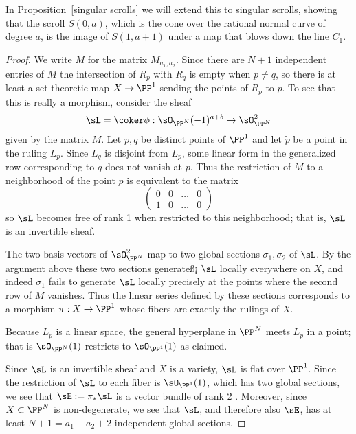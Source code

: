 In Proposition~\ref{singular scrolls} we will extend this to singular scrolls, showing that the scroll $S(0,a)$, 
 which is the cone over the rational normal curve 
of degree $a$, is the image of $S(1,a+1)$ under a map that blows down the line $C_{1}$.

\begin{proof} We write $M$ for the matrix $M_{a_{1}, a_{2}}$.
Since there are $N+1$ independent entries of $M$ the intersection
of $R_{p}$ with $R_{q}$ is empty when $p\neq q$, so there is at least a set-theoretic map $X\to \PP^{1}$ sending the points of $R_{p}$ to $p$. To see that this is really a morphism, consider the sheaf
$$
\sL = \coker \phi: \sO_{\PP^{N}}(-1)^{a+b} \to \sO_{\PP^{N}}^{2}
$$
given by the matrix $M$. Let $p,q$ be distinct points of $\PP^{1}$ and  let
$\tilde p$ be a point in the ruling $L_p$. Since $L_q$ is disjoint from $L_{p}$, some linear form in the generalized row corresponding to $q$ does not vanish at $p$. Thus
the restriction of $M$ to a neighborhood of the point $p$ is equivalent to the matrix
$$
\begin{pmatrix}
0&0&\dots&0 \\
1&0&\dots&0 
\end{pmatrix}
$$
so $\sL$ becomes free of rank 1 when restricted to this neighborhood; that is, $\sL$ is an invertible sheaf.

The two basis vectors of $\sO_{\PP^{N}}^{2}$ map to two global sections
$\sigma_{1},\sigma_{2}$ of $\sL$. By the argument above these two sections generateß¡ $\sL$ locally everywhere on $X$, and indeed $\sigma_{1}$ fails to generate $\sL$ locally precisely at the points where the second row of $M$ vanishes. Thus the linear series
defined by these sections corresponds to a morphism $\pi: X \to \PP^{1}$ whose fibers are exactly the rulings of $X$. 


Because  $L_{p}$ is a linear space, the general hyperplane in $\PP^{N}$
meets $L_{p}$ in a point; that is $\sO_{\PP^{N}}(1)$ restricts to $\sO_{\PP^{1}}(1)$ as claimed.

Since $\sL$ is an invertible sheaf and $X$ is a variety, $\sL$ is flat over $\PP^{1}$. Since the restriction of $\sL$ to each fiber is $\sO_{\PP^{1}}(1)$, which has two global sections, we see that $\sE:= \pi_{*}\sL$ is a vector bundle of rank 2 \cite[Theorem III.12.9]{Hartshorne1977}.
Moreover, since $X\subset \PP^{N}$ is non-degenerate, we see that $\sL$, and therefore also $\sE$, has at least $N+1 = a_{1}+a_{2}+2$ independent global sections. 


\end{proof}
